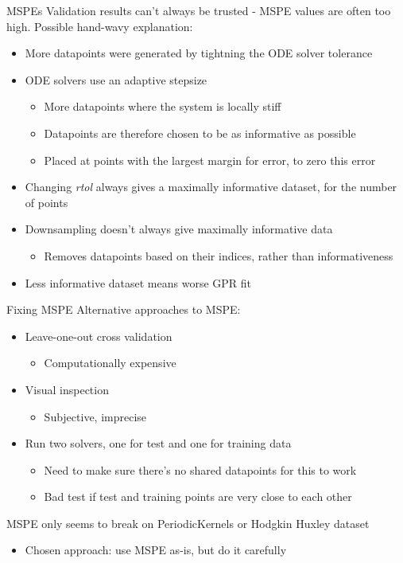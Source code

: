 \documentclass[presentation]{beamer}
\begin{document}
\begin{frame}[label={sec:orgcfd6836}]{MSPEs}
Validation results can't always be trusted - MSPE values are often too high.
Possible hand-wavy explanation:
\begin{itemize}[<+->]
\item More datapoints were generated by tightning the ODE solver tolerance
\item ODE solvers use an adaptive stepsize
\begin{itemize}
\item More datapoints where the system is locally stiff
\item Datapoints are therefore chosen to be as informative as possible
\item Placed at points with the largest margin for error, to zero this error
\end{itemize}
\item Changing \emph{rtol} always gives a maximally informative dataset, for the number of points
\item Downsampling doesn't always give maximally informative data
\begin{itemize}
\item Removes datapoints based on their indices, rather than informativeness
\end{itemize}
\item Less informative dataset means worse GPR fit
\end{itemize}
\end{frame}

\begin{frame}[label={sec:orgb680401}]{Fixing MSPE}
Alternative approaches to MSPE:
\begin{itemize}
\item Leave-one-out cross validation 
\begin{itemize}
\item Computationally expensive
\end{itemize}
\item Visual inspection
\begin{itemize}
\item Subjective, imprecise
\end{itemize}
\item Run two solvers, one for test and one for training data
\begin{itemize}
\item Need to make sure there's no shared datapoints for this to work
\item Bad test if test and training points are very close to each other
\end{itemize}
\end{itemize}
\vfill
MSPE only seems to break on PeriodicKernels or Hodgkin Huxley dataset
\begin{itemize}
\item Chosen approach: use MSPE as-is, but do it carefully
\end{itemize}
\end{frame}
\end{document}

